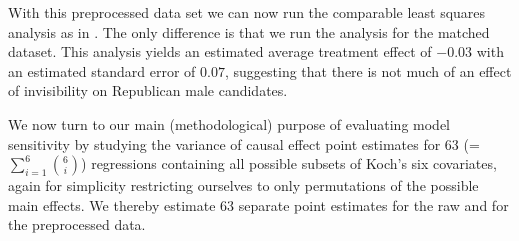 \documentclass[11pt,titlepage]{article}
\begin{document}
With this preprocessed data set we can now run the comparable least
squares analysis as in \citet{Koch02}.  The only difference is that we
run the analysis for the matched dataset.  This analysis yields an
estimated average treatment effect of $-0.03$ with an estimated
standard error of $0.07$, suggesting that there is not much of an
effect of invisibility on Republican male candidates.

We now turn to our main (methodological) purpose of evaluating model
sensitivity by studying the variance of causal effect point estimates
for 63 (=$\sum_{i=1}^6 {6 \choose i}$) regressions containing all
possible subsets of Koch's six covariates, again for simplicity
restricting ourselves to only permutations of the possible main
effects.  We thereby estimate 63 separate point estimates for the raw
and for the preprocessed data.
\end{document}
